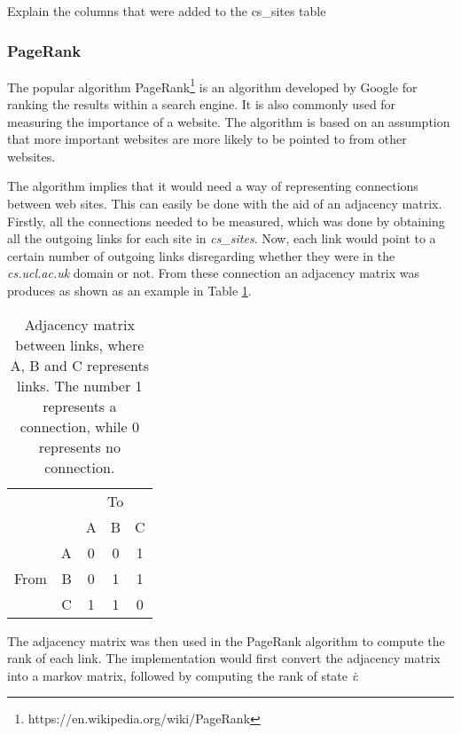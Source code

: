 Explain the columns that were added to the cs\_sites table


\subsubsection{PageRank} %
\label{ssub:pagerank}

The popular algorithm PageRank\footnote{https://en.wikipedia.org/wiki/PageRank} is an algorithm developed by Google for ranking the results within a search engine. It is also commonly used for measuring the importance of a website. The algorithm is based on an assumption that more important websites are more likely to be pointed to from other websites.

The algorithm implies that it would need a way of representing connections between web sites. This can easily be done with the aid of an adjacency matrix. Firstly, all the connections needed to be measured, which was done by obtaining all the outgoing links for each site in \emph{cs\_sites}. Now, each link would point to a certain number of outgoing links disregarding whether they were in the \emph{cs.ucl.ac.uk} domain or not. From these connection an adjacency matrix was produces as shown as an example in Table \ref{fig:adj_mx}. 

\begin{table}[!h]
  \centering
  \begin{tabular}{|lr|c|c|c|} \cline{3-5}
  \multicolumn{1}{l}{} && \multicolumn{3}{c|}{To} \\ \cline{3-5}
  \multicolumn{1}{l}{} & & A & B & C  \\ \hline
  \multirow{3}{*}{\begin{sideways}From\end{sideways}}
  & \multicolumn{1}{|r|}{A} & 0 & 0 & 1  \\ \cline{2-5}
  & \multicolumn{1}{|r|}{B} & 0 & 1 & 1  \\ \cline{2-5}
  & \multicolumn{1}{|r|}{C} & 1 & 1 & 0  \\ \hline
  \end{tabular}
  \caption{Adjacency matrix between links, where A, B and C represents links. The number 1 represents a connection, while 0 represents no connection.}
  \label{fig:adj_mx}
\end{table}

The adjacency matrix was then used in the PageRank algorithm to compute the rank of each link. The implementation would first convert the adjacency matrix into a markov matrix, followed by computing the rank of state \emph{i}:

